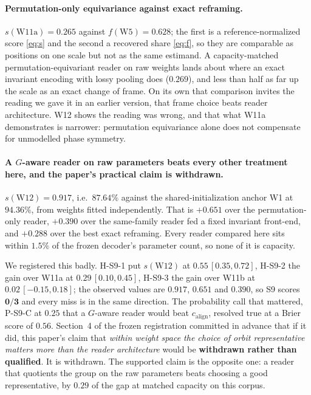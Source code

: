 \documentclass[10pt,twocolumn,letterpaper]{article}
\theoremstyle{definition}
\newcommand{\calign}{c_{\mathrm{align}}}
\begin{document}
\paragraph{Permutation-only equivariance against exact reframing.}
$s(\mathrm{W11a}) = 0.265$ against $f(\mathrm{W5}) = 0.628$; the first is a reference-normalized
score \eqref{eq:s} and the second a recovered share \eqref{eq:f}, so they are comparable as
positions on one scale but not as the same estimand. A capacity-matched permutation-equivariant
reader on raw weights lands about where an exact invariant encoding with lossy pooling does
($0.269$), and less than half as far up the scale as an exact change of frame. On its own that comparison invites the reading we gave it in an earlier version, that
frame choice beats reader architecture. W12 shows the reading was wrong, and that what W11a
demonstrates is narrower: permutation equivariance alone does not compensate for unmodelled phase
symmetry.

\paragraph{A $G$-aware reader on raw parameters beats every other treatment here, and the paper's
practical claim is withdrawn.} $s(\mathrm{W12}) = \mathbf{0.917}$, i.e.\ $87.64\%$ against the
shared-initialization anchor W1 at $94.36\%$, from weights fitted independently. That is $+0.651$ over
the permutation-only reader, $+0.390$ over the same-family reader fed a fixed invariant front-end,
and $+0.288$ over the best exact reframing. Every reader compared here sits within $1.5\%$ of the
frozen decoder's parameter count, so none of it is capacity.

We registered this badly. H-S9-1 put $s(\mathrm{W12})$ at $0.55\,[0.35,0.72]$, H-S9-2 the gain over
W11a at $0.29\,[0.10,0.45]$, H-S9-3 the gain over W11b at $0.02\,[-0.15,0.18]$; the observed values
are $0.917$, $0.651$ and $0.390$, so S9 scores $\mathbf{0/3}$ and every miss is in the same
direction. The probability call that mattered, P-S9-C at $0.25$ that a $G$-aware reader would beat $\calign$, resolved true at a Brier score of $0.56$. Section~4 of the frozen registration
committed in advance that if it did, this paper's claim that \emph{within weight space the choice of
orbit representative matters more than the reader architecture} would be \textbf{withdrawn rather
than qualified}. It is withdrawn. The supported claim is the opposite one: a reader that quotients
the group on the raw parameters beats choosing a good representative, by $0.29$ of the gap at
matched capacity on this corpus.
\end{document}
